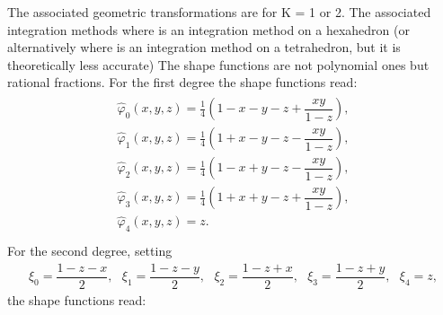 \documentclass[a4paper,11pt,english]{sphinxmanual}
\begin{document}
The associated geometric transformations are  for K = 1 or 2. The associated integration methods  where  is an integration method on a hexahedron (or alternatively  where  is an integration method on a tetrahedron, but it is theoretically less accurate)
The shape functions are not polynomial ones but rational fractions. For the first degree the shape functions read:
\begin{equation*}
\begin{split}\begin{array}{l}
\widehat{\varphi}_{0}(x,y,z) =  \frac{1}{4}\left(1-x-y-z+\dfrac{xy}{1-z}\right), \\
\widehat{\varphi}_{1}(x,y,z) =  \frac{1}{4}\left(1+x-y-z-\dfrac{xy}{1-z}\right), \\
\widehat{\varphi}_{2}(x,y,z) =  \frac{1}{4}\left(1-x+y-z-\dfrac{xy}{1-z}\right), \\
\widehat{\varphi}_{3}(x,y,z) =  \frac{1}{4}\left(1+x+y-z+\dfrac{xy}{1-z}\right), \\
\widehat{\varphi}_{4}(x,y,z) =  z.\\
\end{array}\end{split}
\end{equation*}
For the second degree, setting
\begin{equation*}
\begin{split}\xi_0 = \dfrac{1-z-x}{2}, ~~~\xi_1 = \dfrac{1-z-y}{2}, ~~~\xi_2 = \dfrac{1-z+x}{2}, ~~~\xi_3 = \dfrac{1-z+y}{2}, ~~~\xi_4 = z,\end{split}
\end{equation*}
the shape functions read:
\end{document}
